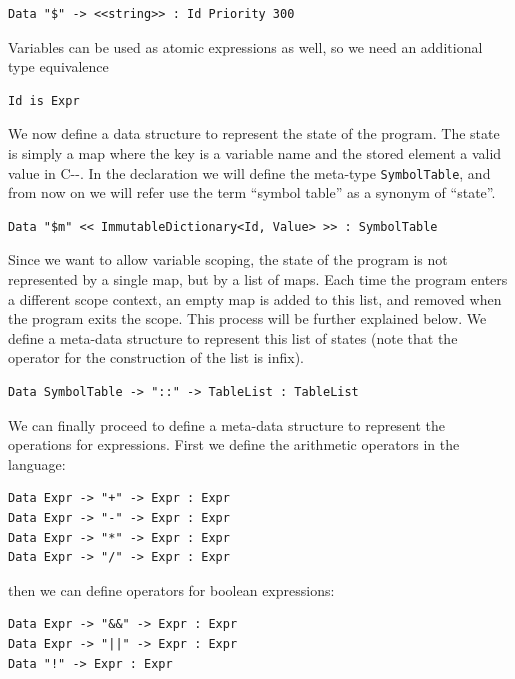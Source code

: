 \begin{lstlisting}
Data "$" -> <<string>> : Id Priority 300
\end{lstlisting}

\noindent
Variables can be used as atomic expressions as well, so we need an additional type equivalence

\begin{lstlisting}
Id is Expr
\end{lstlisting}

\noindent
We now define a data structure to represent the state of the program. The state is simply a map where the key is a variable name and the stored element a valid value in C-{}-. In the declaration we will define the meta-type \texttt{SymbolTable}, and from now on we will refer use the term ``symbol table'' as a synonym of ``state''.

\begin{lstlisting}
Data "$m" << ImmutableDictionary<Id, Value> >> : SymbolTable 
\end{lstlisting}

\noindent
Since we want to allow variable scoping, the state of the program is not represented by a single map, but by a list of maps. Each time the program enters a different scope context, an empty map is added to this list, and removed when the program exits the scope. This process will be further explained below. We define a meta-data structure to represent this list of states (note that the operator for the construction of the list is infix).

\begin{lstlisting}
Data SymbolTable -> "::" -> TableList : TableList
\end{lstlisting}

\noindent
We can finally proceed to define a meta-data structure to represent the operations for expressions. First we define the arithmetic operators in the language:

\begin{lstlisting}
Data Expr -> "+" -> Expr : Expr
Data Expr -> "-" -> Expr : Expr
Data Expr -> "*" -> Expr : Expr
Data Expr -> "/" -> Expr : Expr
\end{lstlisting}

\noindent
then we can define operators for boolean expressions:
\begin{lstlisting}
Data Expr -> "&&" -> Expr : Expr
Data Expr -> "||" -> Expr : Expr
Data "!" -> Expr : Expr
\end{lstlisting}

